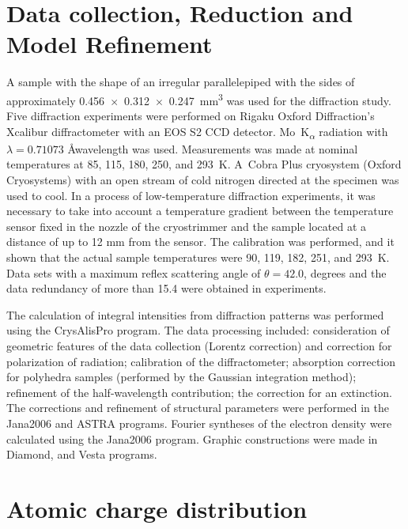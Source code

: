 \documentclass[preprint,review,12pt]{elsarticle}
\begin{document}
\section{Data collection, Reduction and Model Refinement}\label{sec:level1}
A sample with the shape of an irregular parallelepiped with the sides of approximately 0.456~$\times$~0.312~$\times$~0.247~mm\textsuperscript{3} was used for the diffraction study. Five diffraction experiments were performed on Rigaku Oxford Diffraction's Xcalibur diffractometer with an EOS S2 CCD detector. Mo~K\textsubscript{$\alpha$} radiation with  $\lambda=0.71073$ \AA  wavelength was used. Measurements was made at nominal temperatures at
85, 115, 180, 250, and 293~K.
A~Cobra Plus cryosystem (Oxford Cryosystems) with an open stream of cold nitrogen directed at the specimen was used to cool.
In a process of low-temperature diffraction experiments, it was necessary to take into account a temperature gradient between the temperature sensor fixed in the nozzle of the cryostrimmer and the sample located at a distance of up to 12 mm from the sensor.
The calibration was performed\cite{Dudka2016_2}, and it shown that the actual sample temperatures were 90, 119, 182, 251, and 293~K. Data sets with a maximum reflex scattering angle of $\theta=42.0$, degrees and the data redundancy of more than 15.4 were obtained in experiments.

The calculation of integral intensities from diffraction patterns was performed using the CrysAlisPro program\cite{Rigaku}.
The data processing included: consideration of geometric features of the data collection (Lorentz correction) and correction for polarization of radiation; calibration of the diffractometer\cite{Dudka2010}; absorption correction for polyhedra samples (performed by the Gaussian integration method\cite{Busing1957}); refinement of the half-wavelength contribution\cite{Dudka2010_2}; the correction for an extinction\cite{Becker1974}.
The corrections and refinement of structural parameters were performed in the Jana2006\cite{Petek2014} and ASTRA programs\cite{Dudka2007}.
Fourier syntheses of the electron density were calculated using the Jana2006 program\cite{Petek2014}.
Graphic constructions were made in Diamond\cite{Diamont}, and Vesta programs\cite{Momma2011}.


\section{Atomic charge distribution}\label{sec:level1}
\end{document}
